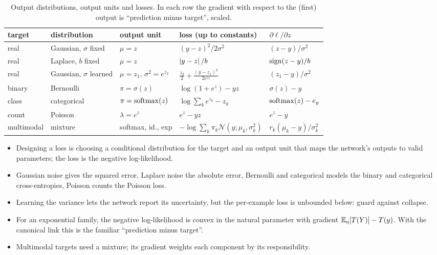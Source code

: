 \begin{notechapter}
\begin{table}[ht]
\centering
\caption{Output distributions, output units and losses. In each row the gradient
with respect to the (first) output is ``prediction minus target'', scaled.}
\label{output-distributions:tab:summary}
\small\setlength{\tabcolsep}{4pt}
\begin{tabular}{@{}lllll@{}}
\toprule
target & distribution & output unit & loss (up to constants) & $\partial\ell/\partial z$ \\
\midrule
real & Gaussian, $\sigma$ fixed & $\mu = z$ & $(y - z)^2/2\sigma^2$ & $(z - y)/\sigma^2$ \\
real & Laplace, $b$ fixed & $\mu = z$ & $\left|y - z\right|/b$ & $\operatorname{sign}(z - y)/b$ \\
real & Gaussian, $\sigma$ learned & $\mu = z_1$, $\sigma^2 = e^{z_2}$ & $\frac{z_2}2 + \frac{(y - z_1)^2}{2e^{z_2}}$ & $(z_1 - y)/\sigma^2$ \\
binary & Bernoulli & $\pi = \sigma(z)$ & $\log(1 + e^z) - yz$ & $\sigma(z) - y$ \\
class & categorical & $\pi = \operatorname{softmax}(z)$ & $\log\sum_ke^{z_k} - z_y$ & $\operatorname{softmax}(z) - e_y$ \\
count & Poisson & $\lambda = e^z$ & $e^z - yz$ & $e^z - y$ \\
multimodal & mixture & softmax, id., exp & $-\log\sum_k\pi_k\mathcal N(y;\mu_k,\sigma_k^2)$ & $r_k(\mu_k - y)/\sigma_k^2$ \\
\bottomrule
\end{tabular}
\end{table}

\begin{chaptersummary}
\begin{itemize}[nosep]
  \item Designing a loss is choosing a conditional distribution for the target and
        an output unit that maps the network's outputs to valid parameters; the loss
        is the negative log-likelihood.
  \item Gaussian noise gives the squared error, Laplace noise the absolute error,
        Bernoulli and categorical models the binary and categorical cross-entropies,
        Poisson counts the Poisson loss.
  \item Learning the variance lets the network report its uncertainty, but the
        per-example loss is unbounded below: guard against collapse.
  \item For an exponential family, the negative log-likelihood is convex in the natural
        parameter with gradient $\mathbb{E}_\eta[T(Y)] - T(y)$. With the canonical link this is the
        familiar ``prediction minus target''.
  \item Multimodal targets need a mixture; its gradient weights each component by
        its responsibility.
\end{itemize}
\end{chaptersummary}


\end{notechapter}
